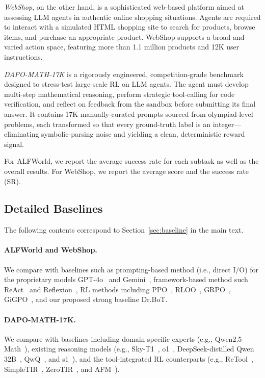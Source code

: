 \documentclass[]{youtu} %
\begin{document}
\textit{WebShop}, on the other hand, is a sophisticated web-based platform aimed at assessing LLM agents in authentic online shopping situations. Agents are required to interact with a simulated HTML shopping site to search for products, browse items, and purchase an appropriate product. WebShop supports a broad and varied action space, featuring more than 1.1 million products and 12K user instructions.


\textit{DAPO-MATH-17K} is a rigorously engineered, competition-grade benchmark designed to stress-test large-scale RL on LLM agents.
The agent must develop multi-step mathematical reasoning, perform strategic tool-calling for code verification, and reflect on feedback from the sandbox before submitting its final answer.
It contains 17K manually-curated prompts sourced from olympiad-level problems, each transformed so that every ground-truth label is an integer—eliminating symbolic-parsing noise and yielding a clean, deterministic reward signal.


For ALFWorld, we report the average success rate for each subtask as well as the overall results.
For WebShop, we report the average score and the success rate (SR).



\subsection{Detailed Baselines}
\label{sec:detailsbaseline}


The following contents correspond to Section~\ref{sec:baseline} in the main text.


\paragraph{ALFWorld and WebShop.}
We compare with baselines such as prompting-based method (i.e., direct I/O) for the proprietary models GPT-4o~\cite{achiam2023gpt} and Gemini~\cite{team2023gemini},
framework-based method such ReAct~\cite{yao2023react} and Reflexion~\cite{shinn2023reflexion},
RL methods including PPO~\cite{schulman2017proximal}, RLOO~\cite{kool2019buy,ahmadian2024back}, GRPO~\cite{shao2024deepseekmath,guo2025deepseek}, GiGPO~\cite{feng2025group}, and our proposed strong baseline Dr.BoT.


\paragraph{DAPO-MATH-17K.}
We compare with baselines including domain-specific experts (e.g., Qwen2.5-Math~\cite{yang2024qwen2}), existing reasoning models (e.g., Sky-T1~\cite{team2025sky}, o1~\cite{jaech2024openai}, DeepSeek-distilled Qwen 32B~\cite{guo2025deepseek}, QwQ~\cite{team2025qwq}, and s1~\cite{muennighoff2025s1}),
and the tool-integrated RL counterparts (e.g., ReTool~\cite{feng2025retool}, SimpleTIR~\cite{xue2025simpletir}, ZeroTIR~\cite{mai2025agent}, and AFM~\cite{li2025chain}).
\end{document}
